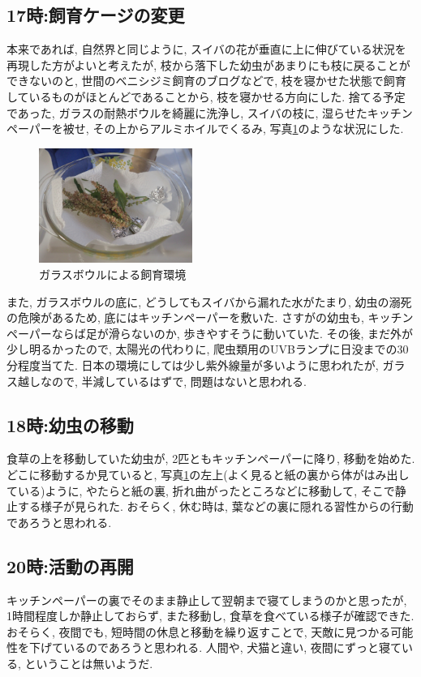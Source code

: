 \documentclass{jsarticle}
\begin{document}
\subsection{17時:飼育ケージの変更}
本来であれば, 自然界と同じように, スイバの花が垂直に上に伸びている状況を再現した方がよいと考えたが, 
枝から落下した幼虫があまりにも枝に戻ることができないのと, 世間のベニシジミ飼育のブログなどで, 枝を寝かせた状態で飼育しているものがほとんどであることから, 
枝を寝かせる方向にした. 捨てる予定であった, ガラスの耐熱ボウルを綺麗に洗浄し, スイバの枝に, 湿らせたキッチンペーパーを被せ, 
その上からアルミホイルでくるみ, 写真\ref{pic-environment}のような状況にした. 
\begin{figure}[htbp]
  \begin{center}
    \includegraphics[width=5cm]{photo/environment.JPG}
    \caption{ガラスボウルによる飼育環境}
    \label{pic-environment}
  \end{center}
\end{figure}
また, ガラスボウルの底に, どうしてもスイバから漏れた水がたまり, 幼虫の溺死の危険があるため, 
底にはキッチンペーパーを敷いた. さすがの幼虫も, キッチンペーパーならば足が滑らないのか, 歩きやすそうに動いていた. 
その後, まだ外が少し明るかったので, 太陽光の代わりに, 爬虫類用のUVBランプに日没までの30分程度当てた. 
日本の環境にしては少し紫外線量が多いように思われたが, ガラス越しなので, 半減しているはずで, 問題はないと思われる. 

\subsection{18時:幼虫の移動}
食草の上を移動していた幼虫が, 2匹ともキッチンペーパーに降り, 移動を始めた. 
どこに移動するか見ていると, 写真\ref{pic-environment}の左上(よく見ると紙の裏から体がはみ出している)ように, やたらと紙の裏, 折れ曲がったところなどに移動して, そこで静止する様子が見られた. 
おそらく, 休む時は, 葉などの裏に隠れる習性からの行動であろうと思われる. 

\subsection{20時:活動の再開}
キッチンペーパーの裏でそのまま静止して翌朝まで寝てしまうのかと思ったが, 1時間程度しか静止しておらず, また移動し, 食草を食べている様子が確認できた. 
おそらく, 夜間でも, 短時間の休息と移動を繰り返すことで, 天敵に見つかる可能性を下げているのであろうと思われる. 
人間や, 犬猫と違い, 夜間にずっと寝ている, ということは無いようだ. 
\end{document}

